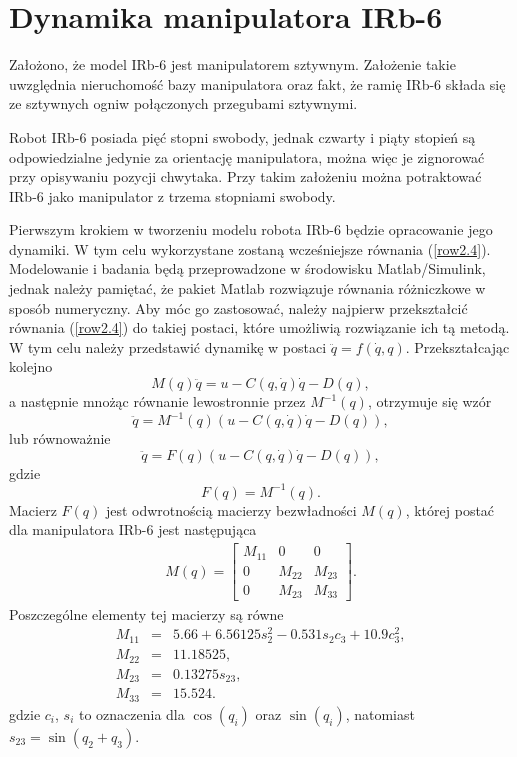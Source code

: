 \documentclass[eng,printmode]{mgr}
\begin{document}
\section{Dynamika manipulatora IRb-6}
Założono, że model IRb-6 jest manipulatorem sztywnym. Założenie takie uwzględnia nieruchomość bazy manipulatora oraz fakt, że ramię IRb-6 składa się ze sztywnych ogniw połączonych przegubami sztywnymi. \newline


Robot IRb-6 posiada pięć stopni swobody, jednak czwarty i piąty stopień są odpowiedzialne jedynie za orientację manipulatora, można więc je zignorować przy opisywaniu pozycji chwytaka. Przy takim założeniu można potraktować IRb-6 jako manipulator z trzema stopniami swobody.

Pierwszym krokiem w tworzeniu modelu robota IRb-6 będzie opracowanie jego dynamiki. W tym celu wykorzystane zostaną wcześniejsze równania (\ref{row2.4}).
Modelowanie i badania będą przeprowadzone w środowisku Matlab/Simulink, jednak należy pamiętać, że pakiet Matlab rozwiązuje równania różniczkowe w sposób numeryczny. Aby móc go zastosować, należy najpierw przekształcić równania (\ref{row2.4}) do takiej postaci, które umożliwią rozwiązanie ich tą metodą. W tym celu należy przedstawić dynamikę w postaci $\ddot{q}=f(\dot{q}, q)$. Przekształcając kolejno
\begin{equation}
M(q)\ddot{q}=u - C(q, \dot{q})\dot{q} - D(q),\label{row2.7}
\end{equation}
a następnie mnożąc równanie lewostronnie przez $M^{-1}(q)$, otrzymuje się wzór
\begin{equation}
\ddot{q} = M^{-1}(q) (u - C(q, \dot{q})\dot{q} - D(q)),\label{row2.8}
\end{equation}
lub równoważnie
\begin{equation}\label{row2.9}
\ddot{q} = F(q) (u - C(q, \dot{q})\dot{q} - D(q)),
\end{equation}
gdzie 
\begin{equation}
F(q)=M^{-1}(q) .
\end{equation}
Macierz $F(q)$  jest odwrotnością macierzy bezwładności $M(q)$, której postać dla manipulatora IRb-6 jest następująca
\begin{eqnarray}\label{row2.11}
M(q)=\left[
        \begin{array}{ccc}
         M_{11}& 0 & 0\\ 
         0 & M_{22} & M_{23}\\
         0 & M_{23} & M_{33}
         \end{array}
      \right].
\end{eqnarray}
Poszczególne elementy tej macierzy są równe
\begin{eqnarray}\label{row2.12}
M_{11} &=& 5.66+6.56125s_2^2  -0.531s_2c_3 + 10.9c_3^2,\\
M_{22} &=& 11.18525,\nonumber \\
M_{23} &=& 0.13275s_{23},\nonumber \\
M_{33} &=& 15.524.\nonumber
\end{eqnarray}
 gdzie $c_i$, $s_i$ to oznaczenia dla $\cos(q_i)$ oraz $\sin(q_i)$, natomiast $s_{23}=\sin(q_2+q_3)$.
\end{document}
